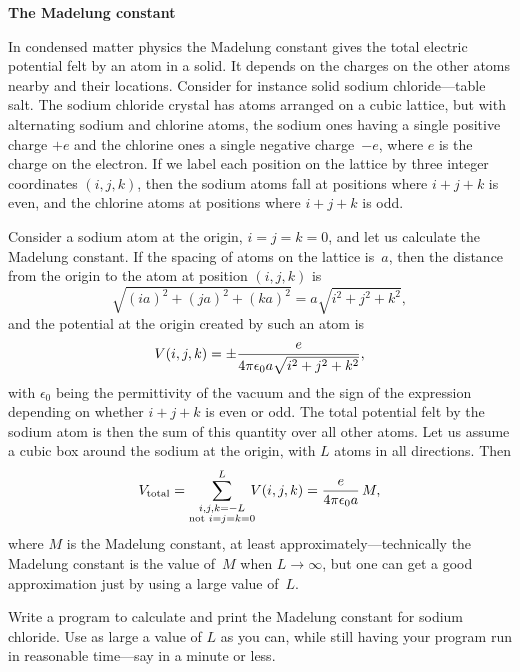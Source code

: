 \documentclass[12pt]{article}
\begin{document}
\begin{exercises}
\exercise \textbf{The Madelung constant}

\exskip In condensed matter physics the Madelung constant gives the total
electric potential felt by an atom in a solid.  It depends on the charges
on the other atoms nearby and their locations.  Consider for instance solid
sodium chloride---table salt.  The sodium chloride crystal has atoms
arranged on a cubic lattice, but with alternating sodium and chlorine
atoms, the sodium ones having a single positive charge $+e$ and the
chlorine ones a single negative charge~$-e$, where $e$ is the charge on the
electron.  If we label each position on the lattice by three integer
coordinates $(i,j,k)$, then the sodium atoms fall at positions where
$i+j+k$ is even, and the chlorine atoms at positions where $i+j+k$ is odd.

Consider a sodium atom at the origin, $i=j=k=0$, and let us calculate the
Madelung constant.  If the spacing of atoms on the lattice is~$a$, then the
distance from the origin to the atom at position $(i,j,k)$ is
\begin{displaymath}
\sqrt{(ia)^2 + (ja)^2 + (ka)^2} = a \sqrt{i^2+j^2+k^2},
\end{displaymath}
and the potential at the origin created by such an atom is
\begin{displaymath}
V(i,j,k) = \pm {e\over4\pi\epsilon_0 a\sqrt{i^2+j^2+k^2}},
\end{displaymath}
with $\epsilon_0$ being the permittivity of the vacuum and the sign of the
expression depending on whether $i+j+k$ is even or odd.  The total
potential felt by the sodium atom is then the sum of this quantity over all
other atoms.  Let us assume a cubic box around the sodium at the origin,
with $L$ atoms in all directions.  Then
\begin{displaymath}
V_\textrm{total} = \sum_{\substack{i,j,k=-L\\ \textrm{not }i=j=k=0}}^L
                   \hspace{-0.5em} V(i,j,k)
                 = {e\over4\pi\epsilon_0 a}\,M,
\end{displaymath}
where $M$ is the Madelung constant, at least approximately---technically
the Madelung constant is the value of~$M$ when $L\to\infty$, but one can
get a good approximation just by using a large value of~$L$.

Write a program to calculate and print the Madelung constant for sodium
chloride.  Use as large a value of $L$ as you can, while still having your
program run in reasonable time---say in a minute or less.



\end{exercises}
\end{document}
